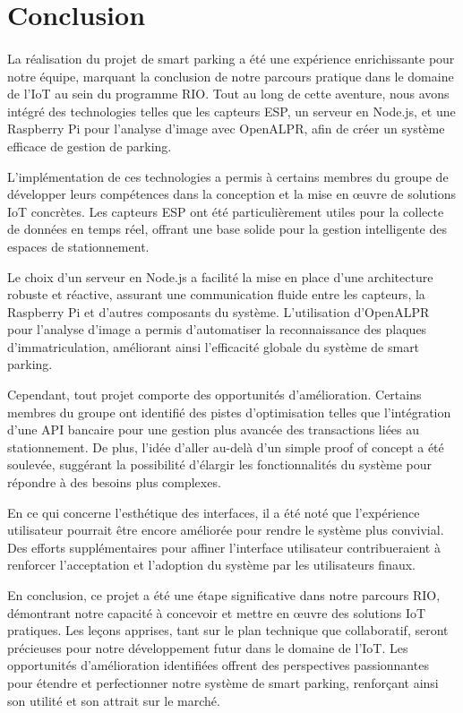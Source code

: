 \section*{Conclusion}

\paragraph*{}
La réalisation du projet de smart parking a été une expérience enrichissante pour notre équipe, marquant la conclusion de notre parcours pratique dans le domaine de l'IoT au sein du programme RIO. Tout au long de cette aventure, nous avons intégré des technologies telles que les capteurs ESP, un serveur en Node.js, et une Raspberry Pi pour l'analyse d'image avec OpenALPR, afin de créer un système efficace de gestion de parking.

L'implémentation de ces technologies a permis à certains membres du groupe de développer leurs compétences dans la conception et la mise en œuvre de solutions IoT concrètes. Les capteurs ESP ont été particulièrement utiles pour la collecte de données en temps réel, offrant une base solide pour la gestion intelligente des espaces de stationnement.

Le choix d'un serveur en Node.js a facilité la mise en place d'une architecture robuste et réactive, assurant une communication fluide entre les capteurs, la Raspberry Pi et d'autres composants du système. L'utilisation d'OpenALPR pour l'analyse d'image a permis d'automatiser la reconnaissance des plaques d'immatriculation, améliorant ainsi l'efficacité globale du système de smart parking.

Cependant, tout projet comporte des opportunités d'amélioration. Certains membres du groupe ont identifié des pistes d'optimisation telles que l'intégration d'une API bancaire pour une gestion plus avancée des transactions liées au stationnement. De plus, l'idée d'aller au-delà d'un simple proof of concept a été soulevée, suggérant la possibilité d'élargir les fonctionnalités du système pour répondre à des besoins plus complexes.

En ce qui concerne l'esthétique des interfaces, il a été noté que l'expérience utilisateur pourrait être encore améliorée pour rendre le système plus convivial. Des efforts supplémentaires pour affiner l'interface utilisateur contribueraient à renforcer l'acceptation et l'adoption du système par les utilisateurs finaux.

En conclusion, ce projet a été une étape significative dans notre parcours RIO, démontrant notre capacité à concevoir et mettre en \oe{}uvre des solutions IoT pratiques. Les leçons apprises, tant sur le plan technique que collaboratif, seront précieuses pour notre développement futur dans le domaine de l'IoT. Les opportunités d'amélioration identifiées offrent des perspectives passionnantes pour étendre et perfectionner notre système de smart parking, renforçant ainsi son utilité et son attrait sur le marché.

